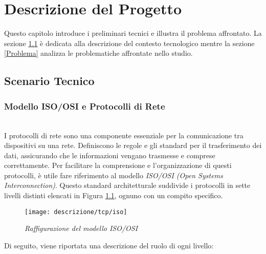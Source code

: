 \chapter{Descrizione del Progetto}
\label{cap:descrizione}

Questo capitolo introduce i preliminari tecnici e illustra il problema affrontato. La sezione \ref{Scenario} è dedicata alla descrizione del contesto tecnologico mentre la sezione \ref{Problema} analizza le problematiche affrontate nello studio. 

\section{Scenario Tecnico}
\label{Scenario}
\subsection{Modello ISO/OSI e Protocolli di Rete}
~\\
\indent I protocolli di rete sono una componente essenziale per la comunicazione tra dispositivi su una rete. 
Definiscono le regole e gli standard per il trasferimento dei dati, assicurando che le informazioni vengano trasmesse e comprese correttamente.
Per facilitare la comprensione e l'organizzazione di questi protocolli, è utile fare riferimento al modello \emph{ISO/OSI (Open Systems Interconnection)}.
Questo standard architetturale suddivide i protocolli in sette livelli distinti elencati in Figura \ref{iso-osi}, ognuno con un compito specifico.
\begin{figure}[!h]
    \centering
    \texttt{[image: descrizione/tcp/iso]}
    \caption{\emph{Raffigurazione del modello ISO/OSI}}
    \label{iso-osi}
\end{figure}
Di seguito, viene riportata una descrizione del ruolo di ogni livello: 
